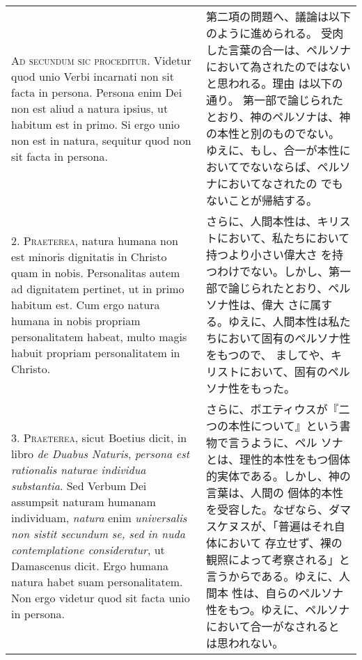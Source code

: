 \documentclass[10pt]{jsarticle} %
\begin{document}
\begin{longtable}{p{21em}p{21em}}




{\Huge A}{\scshape d secundum sic proceditur}. Videtur quod unio Verbi incarnati non sit
facta in persona. Persona enim Dei non est aliud a natura ipsius, ut
habitum est in primo. Si ergo unio non est in natura, sequitur quod non
sit facta in persona.


&


第二項の問題へ、議論は以下のように進められる。
受肉した言葉の合一は、ペルソナにおいて為されたのではないと思われる。理由
 は以下の通り。
第一部で論じられたとおり、神のペルソナは、神の本性と別のものでない。
ゆえに、もし、合一が本性においてでないならば、ペルソナにおいてなされたの
 でもないことが帰結する。

\\



2. {\scshape Praeterea}, natura humana non est minoris dignitatis in Christo quam in
nobis. Personalitas autem ad dignitatem pertinet, ut in primo habitum
est. Cum ergo natura humana in nobis propriam personalitatem habeat,
multo magis habuit propriam personalitatem in Christo.


&


さらに、人間本性は、キリストにおいて、私たちにおいて持つより小さい偉大さ
 を持つわけでない。しかし、第一部で論じられたとおり、ペルソナ性は、偉大
 さに属する。ゆえに、人間本性は私たちにおいて固有のペルソナ性をもつので、
 ましてや、キリストにおいて、固有のペルソナ性をもった。

\\



3. {\scshape Praeterea}, sicut Boetius dicit, in libro {\itshape de Duabus Naturis}, {\itshape persona est
rationalis naturae individua substantia}. Sed Verbum Dei assumpsit
naturam humanam individuam, {\itshape natura} enim {\itshape universalis non sistit secundum
se, sed in nuda contemplatione consideratur}, ut Damascenus dicit. Ergo
humana natura habet suam personalitatem. Non ergo videtur quod sit facta
unio in persona.


&

さらに、ボエティウスが『二つの本性について』という書物で言うように、ペル
 ソナとは、理性的本性をもつ個体的実体である。しかし、神の言葉は、人間の
 個体的本性を受容した。なぜなら、ダマスケヌスが、「普遍はそれ自体において
 存立せず、裸の観照によって考察される」と言うからである。ゆえに、人間本
 性は、自らのペルソナ性をもつ。ゆえに、ペルソナにおいて合一がなされると
 は思われない。



\end{longtable}
\end{document}
